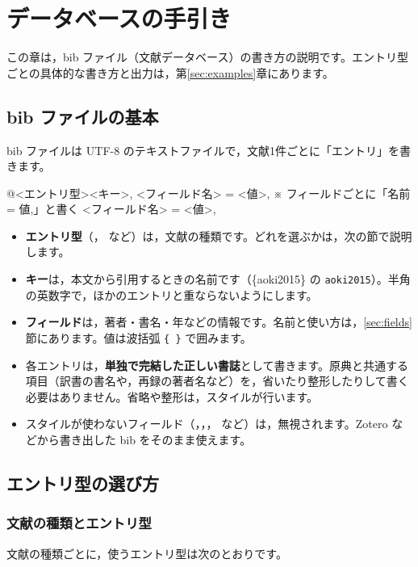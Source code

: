 \section{データベースの手引き}\label{sec:db}
この章は，bib ファイル（文献データベース）の書き方の説明です。エントリ型ごとの具体的な書き方と出力は，第\ref{sec:examples}章にあります。

\subsection{bib ファイルの基本}
bib ファイルは UTF-8 のテキストファイルで，文献1件ごとに「エントリ」を書きます。

\begin{bibtemplate}
@<エントリ型>{<キー>,
  <フィールド名> = {<値>},    ※ フィールドごとに「名前 = {値},」と書く
  <フィールド名> = {<値>},
}
\end{bibtemplate}

\begin{itemize}
\item \textbf{エントリ型}（， など）は，文献の種類です。どれを選ぶかは，次の節で説明します。
\item \textbf{キー}は，本文から引用するときの名前です（\{aoki2015\} の \texttt{aoki2015}）。半角の英数字で，ほかのエントリと重ならないようにします。
\item \textbf{フィールド}は，著者・書名・年などの情報です。名前と使い方は，\ref{sec:fields}節にあります。値は波括弧 \texttt{\{\ \}} で囲みます。
\item 各エントリは，\textbf{単独で完結した正しい書誌}として書きます。原典と共通する項目（訳書の書名や，再録の著者名など）を，省いたり整形したりして書く必要はありません。省略や整形は，スタイルが行います。
\item スタイルが使わないフィールド（，，， など）は，無視されます。Zotero などから書き出した bib をそのまま使えます。
\end{itemize}

\subsection{エントリ型の選び方}\label{sec:choose}
\subsubsection{文献の種類とエントリ型}
文献の種類ごとに，使うエントリ型は次のとおりです。

